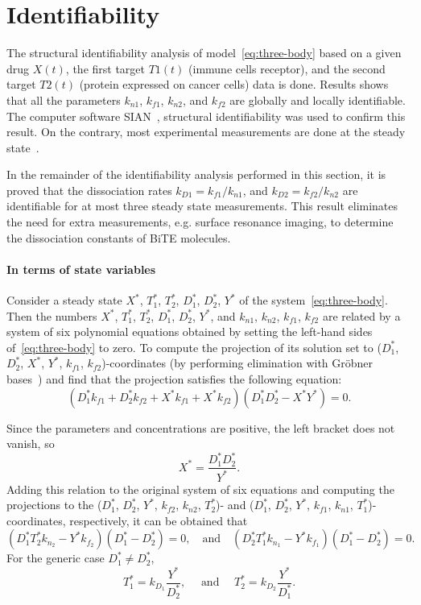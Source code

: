 \section{Identifiability} \label{sec:identifiability}
The structural identifiability analysis of model~\eqref{eq:three-body} based on a given drug $X(t)$, the first target $T1(t)$ (immune cells receptor), and the second target $T2(t)$ (protein expressed on cancer cells) data is done. Results shows that all the parameters $k_{n1}$, $k_{f1}$, $k_{n2}$, and $k_{f2}$ are globally and locally identifiable. The computer software SIAN~\cite{hong2019sian}, structural identifiability was used to confirm this result. On the contrary, most experimental measurements are done at the steady state~\cite{dreier2002extremely,brischwein2006mt110,friedrich2012regression,root2016development,yeung2020optimized,mathur2020novel,giffin2021amg,deegen2021psma}. 

In the remainder of the identifiability analysis performed in this section, it is proved that the dissociation rates $k_{D1} = k_{f1}/k_{n1}$, and $k_{D2} = k_{f2}/k_{n2}$ are
identifiable for at most three steady state measurements. This result eliminates the need for extra measurements, e.g. surface resonance imaging, to determine the dissociation constants of BiTE
molecules.

\paragraph{In terms of state variables} 
Consider a steady state $X^*$, $T_1^*$, $T_2^*$, $D_1^*$, $D_2^*$, $Y^*$ of the system~\eqref{eq:three-body}. 
Then the numbers $X^*$, $T_1^*$, $T_2^*$, $D_1^*$, $D_2^*$, $Y^*$, and $k_{n1}$, $k_{n2}$, $k_{f1}$, $k_{f2}$ are related by a system of six polynomial equations obtained by setting the left-hand sides of~\eqref{eq:three-body} to zero. 
To compute the projection of its solution set to ($D_1^*$, $D_2^*$, $X^*$, $Y^*$, $k_{f1}$, $k_{f2}$)-coordinates (by performing elimination with Gr\"obner bases~\cite[Chapter 2, \S 1]{CLO}) and find that the projection satisfies the following equation:
\[
\left ( D_1^* k_{f1} + D_2^* k_{f2} + X^* k_{f1} + X^*k_{f2} \right )
\left ( D_1^*  D_2^* - X^* Y^* \right ) =0.
\]

Since the parameters and concentrations are positive, the left bracket does not vanish, so 
\begin{equation}\label{eq:stst1}
	X^* = \frac{D_1^* D_2^*}{Y^*}.
\end{equation}
Adding this relation to the original system of six equations and computing the projections to the ($D_1^*$, $D_2^*$, $Y^*$, $k_{f2}$, $k_{n2}$, $T_2^*$)- and ($D_1^*$, $D_2^*$, $Y^*$, $k_{f1}$, $k_{n1}$, $T_1^*$)-coordinates, respectively, it can be obtained that
\[
(D_1^* T_2^* k_{n_2} - Y^* k_{f_2}) (D_1^* - D_2^*) = 0, \quad \text{and}\quad (D_2^* T_1^* k_{n_1} - Y^* k_{f_1}) (D_1^* - D_2^*) = 0.
\]
For the generic case $D_1^* \neq D_2^*$, 
\begin{equation}\label{eq:stst2}
	T_1^* = k_{D_1} \frac{Y^*}{D_2^*},\quad \text{ and } \quad T_2^* = k_{D_2} \frac{Y^*}{D_1^*}.
\end{equation}

